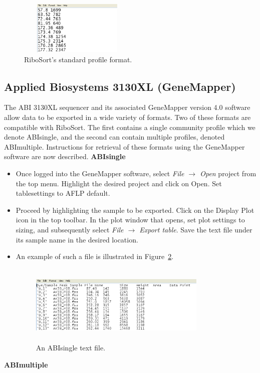 \documentclass[a4paper]{article}
\begin{document}
\begin{figure}
\centering
\includegraphics[width=0.5\textwidth,height=1in]{EPS/picstandard.eps}
\caption{RiboSort's standard profile format.}
\label{fig:std}
\end{figure}

\subsection{\textbf{Applied Biosystems 3130XL (GeneMapper)}}
The ABI 3130XL sequencer and its associated GeneMapper version 4.0 software allow data to be exported in a wide variety of formats. Two of these formats are compatible with RiboSort. The first contains a single community profile which we  denote ABIsingle, and the second can contain multiple profiles, denoted ABImultiple. Instructions for retrieval of these formats using the GeneMapper software are now described.
\newline
\newline
\textbf{ABIsingle}

\begin{itemize}
\item Once logged into the GeneMapper software, select {\em File $\rightarrow$ Open}  project from the top menu. Highlight the desired project and click on Open. Set tablesettings to AFLP default.
\item Proceed by highlighting the sample to be exported. Click on the Display Plot icon in the top toolbar. In the plot window that opens, set plot settings to sizing, and subsequently select {\em File $\rightarrow$ Export table}. Save the text file under its sample name in the desired location.
\item An example of such a file is illustrated in Figure~\ref{fig:abisingle}.

\begin{figure}
\centering
\includegraphics[width=0.8\textwidth,height=1.5in]{EPS/picabisingle.eps}
\caption{An ABIsingle text file.}
\label{fig:abisingle}
\end{figure}

\end{itemize}
\textbf{ABImultiple}
\end{document}
